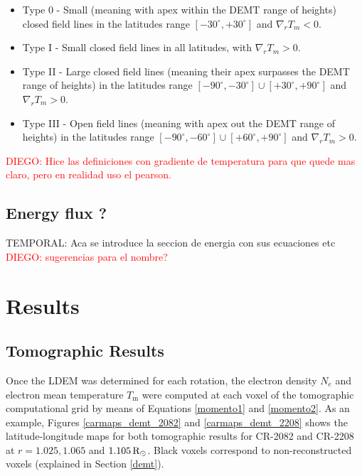 \documentclass[namedreferences]{solarphysics}
\newcommand{\mdeg}{^\circ}
\newcommand{\mrsun}{{\rm R_\odot}}
\def\diego#1{\textcolor{red}{DIEGO: #1}}
\def\temp#1{\textcolor{mygray}{TEMPORAL: #1}}
\begin{document}
\begin{article}
\begin{itemize}
 \item Type 0 - Small (meaning with apex within the DEMT range of heights) closed field lines in the latitudes range $[-30\mdeg,+30\mdeg]$ and $\nabla_r T_m < 0$. %

\item  Type I - Small closed field lines in all latitudes, with $\nabla_r T_m > 0$. %

\item  Type II - Large closed field lines (meaning their apex surpasses the DEMT range of heights) in the latitudes range $[-90\mdeg,-30\mdeg] \cup [+30\mdeg,+90\mdeg]$ and $\nabla_r T_m > 0$. %

\item Type III - Open field lines (meaning with apex out the DEMT range of heights) in the latitudes range $[-90\mdeg,-60\mdeg] \cup [+60\mdeg,+90\mdeg]$ and $\nabla_r T_m > 0$.

\end{itemize}
\diego{Hice las definiciones con gradiente de temperatura para que quede mas claro, pero en realidad uso el pearson.} 




\subsection{Energy flux ?}\label{energia} 
\temp{Aca se introduce la seccion de energia con sus ecuaciones etc}
\diego{sugerencias para el nombre?}




\section{Results}\label{resu} 



\subsection{Tomographic Results}\label{demt_res} 

Once the LDEM was determined for each rotation, the electron density $N_e$ and electron mean temperature $T_\textrm{m}$ were computed at each voxel of the tomographic computational grid by means of Equations \ref{momento1} and \ref{momento2}. As an example, Figures \ref{carmaps_demt_2082} and \ref{carmaps_demt_2208} shows the latitude-longitude maps for both tomographic results for CR-2082 and CR-2208 at $r=1.025, 1.065$ and $1.105\,\mrsun$. Black voxels correspond to non-reconstructed voxels (explained in Section \ref{demt}).



\end{article}
\end{document}
